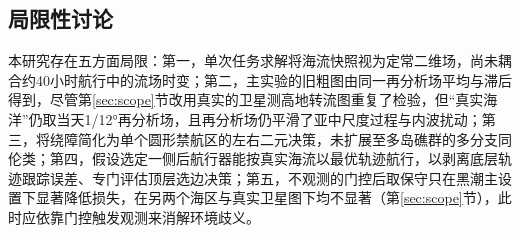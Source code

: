 \begin{table}[htbp]
\centering
\caption{不同海流图、航行器速度、合理集合构造方法与海区下的适用范围与消融实验结果（测试年份；损失单位：小时；门控后上浮取图指取当天0.5°图）。}
\label{tab:scope}
\small

\end{table}

\subsection{局限性讨论}
本研究存在五方面局限：第一，单次任务求解将海流快照视为定常二维场，尚未耦合约40小时航行中的流场时变；第二，主实验的旧粗图由同一再分析场平均与滞后得到，尽管第\ref{sec:scope}节改用真实的卫星测高地转流图重复了检验，但“真实海洋”仍取当天1/12°再分析场，且再分析场仍平滑了亚中尺度过程与内波扰动；第三，将绕障简化为单个圆形禁航区的左右二元决策，未扩展至多岛礁群的多分支同伦类；第四，假设选定一侧后航行器能按真实海流以最优轨迹航行，以剥离底层轨迹跟踪误差、专门评估顶层选边决策；第五，不观测的门控后取保守只在黑潮主设置下显著降低损失，在另两个海区与真实卫星图下均不显著（第\ref{sec:scope}节），此时应依靠门控触发观测来消解环境歧义。
